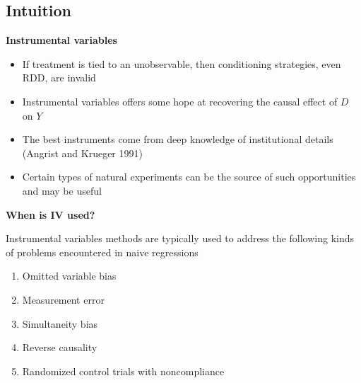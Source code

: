 \documentclass[notes=show]{beamer}
\begin{document}
\subsection{Intuition}

\begin{frame}
\begin{center}
\textbf{Instrumental variables}
\end{center}

\begin{itemize}
\item If treatment is tied to an unobservable, then conditioning strategies, even RDD, are invalid
\item Instrumental variables offers some hope at recovering the causal effect of $D$ on $Y$
\item The best instruments come from deep knowledge of institutional details (Angrist and Krueger 1991)
\item Certain types of natural experiments can be the source of such opportunities and may be useful
\end{itemize}

\end{frame}


\begin{frame}[plain]

	\begin{center}
	\textbf{When is IV used?}
	\end{center}
	
Instrumental variables methods are typically used to address the following kinds of problems encountered in naive regressions
		\begin{enumerate}
		\item Omitted variable bias
		\item Measurement error
		\item Simultaneity bias
		\item Reverse causality
		\item Randomized control trials with noncompliance
		\end{enumerate}
		

\end{frame}
\end{document}
